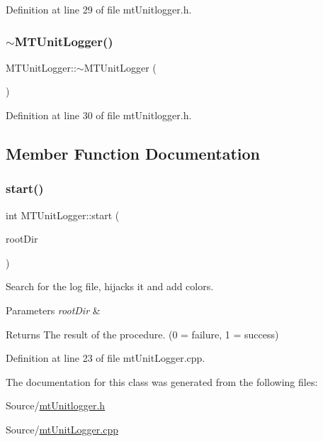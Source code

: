 Definition at line 29 of file mt\+Unitlogger.\+h.

\mbox{\label{class_m_t_unit_logger_a249a83d04603d90af2ab7ba7a0245093}} 
\subsubsection{\texorpdfstring{$\sim$\+M\+T\+Unit\+Logger()}{~MTUnitLogger()}}
{\footnotesize\ttfamily M\+T\+Unit\+Logger\+::$\sim$\+M\+T\+Unit\+Logger (\begin{DoxyParamCaption}{ }\end{DoxyParamCaption})\hspace{0.3cm}{\ttfamily [inline]}}



Definition at line 30 of file mt\+Unitlogger.\+h.



\subsection{Member Function Documentation}
\mbox{\label{class_m_t_unit_logger_ae93ca7c78500192d14aba3dcd73ba37e}} 
\subsubsection{\texorpdfstring{start()}{start()}}
{\footnotesize\ttfamily int M\+T\+Unit\+Logger\+::start (\begin{DoxyParamCaption}\item[{Q\+String}]{root\+Dir }\end{DoxyParamCaption})}



Search for the log file, hijacks it and add colors. 


\begin{DoxyParams}{Parameters}
{\em root\+Dir} & \\
\hline
\end{DoxyParams}
\begin{DoxyReturn}{Returns}
The result of the procedure. (0 = failure, 1 = success) 
\end{DoxyReturn}


Definition at line 23 of file mt\+Unit\+Logger.\+cpp.



The documentation for this class was generated from the following files\+:\begin{DoxyCompactItemize}
\item 
Source/\mbox{\hyperlink{mt_unitlogger_8h}{mt\+Unitlogger.\+h}}\item 
Source/\mbox{\hyperlink{mt_unit_logger_8cpp}{mt\+Unit\+Logger.\+cpp}}\end{DoxyCompactItemize}
